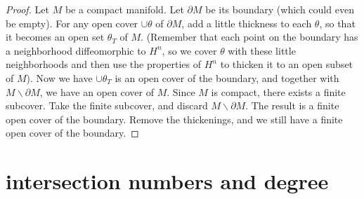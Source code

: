 \documentclass[11pt]{amsbook}
\theoremstyle{mystyle} \newtheorem{thrm}[thm]{Theorem}
\theoremstyle{mystyle} \newtheorem{defi}[thm]{Definition}
\theoremstyle{mystyle} \newtheorem{coro}[thm]{Corollary}
\theoremstyle{mystyle} \newtheorem{propo}[thm]{Proposition}
\theoremstyle{mystyle} \newtheorem{lemm}[thm]{Lemma}
\numberwithin{thm}{section}
\newcommand{\minus}{\smallsetminus}
\renewcommand{\d}{\partial}
\begin{document}
\begin{proof}
	Let $M$ be a compact manifold.  Let $\d M$ be its boundary (which could even be empty).  For any open cover $\cup \theta$ of $\d M$, add a little thickness to each $\theta$, so that it becomes an open set $\theta_T$ of $M$.  (Remember that each point on the boundary has a neighborhood diffeomorphic to $H^n$, so we cover $\theta$ with these little neighborhoods and then use the properties of $H^n$ to thicken it to an open subset of $M$).  Now we have $\cup \theta_T$ is an open cover of the boundary, and together with $M \minus \d M$, we have an open cover of $M$.  Since $M$ is compact, there exists a finite subcover.  Take the finite subcover, and discard $M \minus \d M$.  The result is a finite open cover of the boundary.  Remove the thickenings, and we still have a finite open cover of the boundary.
\end{proof}

\section{intersection numbers and degree}
\end{document}

